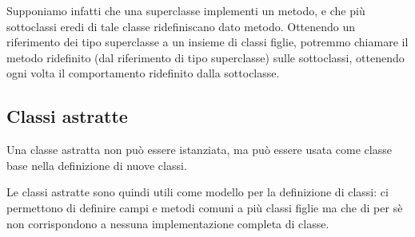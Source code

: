\documentclass[a4paper,11pt]{article}
\begin{document}
Supponiamo infatti che una superclasse implementi un metodo, e che più sottoclassi eredi di tale classe ridefiniscano dato metodo.
Ottenendo un riferimento dei tipo superclasse a un insieme di classi figlie, potremmo chiamare il metodo ridefinito (dal riferimento di tipo superclasse) sulle sottoclassi, ottenendo ogni volta il comportamento ridefinito dalla sottoclasse.

\subsection{Classi astratte}
Una classe astratta non può essere istanziata, ma può essere usata come classe base nella definizione di nuove classi.

Le classi astratte sono quindi utili come modello per la definizione di classi: ci permettono di definire campi e metodi comuni a più classi figlie ma che di per sè non corrispondono a nessuna implementazione completa di classe.
\end{document}
